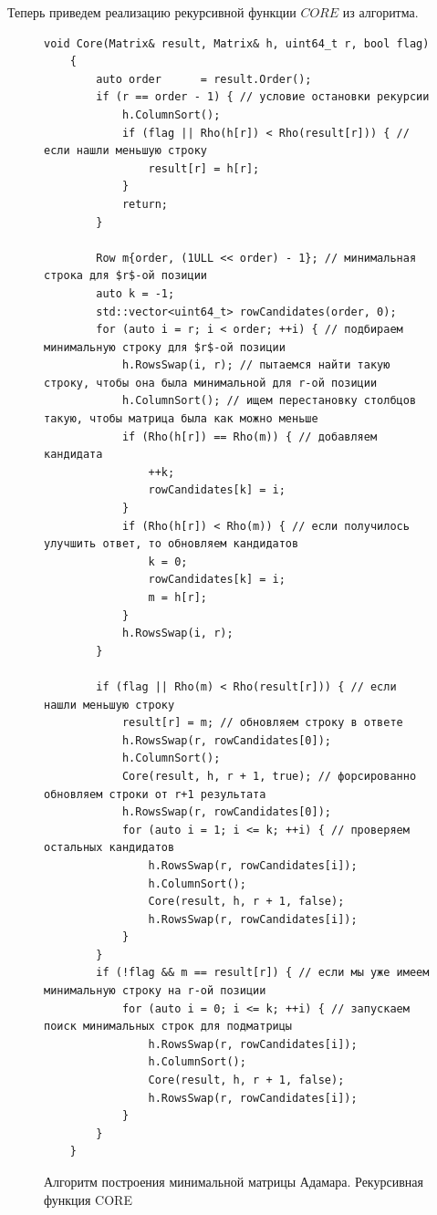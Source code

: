 \documentclass[a4paper, 14pt]{extreport}
\begin{document}
Теперь приведем реализацию рекурсивной функции $CORE$ из алгоритма. 

\begin{figure}[H]
    \centering
    \begin{minipage}{\linewidth}
    \begin{lstlisting}[language=С++, tabsize=4, showspaces=false, basicstyle=\fontsize{9.5}{8.0}\selectfont, numbers=none]
    void Core(Matrix& result, Matrix& h, uint64_t r, bool flag)
    {
        auto order      = result.Order();
        if (r == order - 1) { // условие остановки рекурсии
            h.ColumnSort();
            if (flag || Rho(h[r]) < Rho(result[r])) { // если нашли меньшую строку
                result[r] = h[r];
            }
            return;
        }
    
        Row m{order, (1ULL << order) - 1}; // минимальная строка для $r$-ой позиции
        auto k = -1;
        std::vector<uint64_t> rowCandidates(order, 0);
        for (auto i = r; i < order; ++i) { // подбираем минимальную строку для $r$-ой позиции
            h.RowsSwap(i, r); // пытаемся найти такую строку, чтобы она была минимальной для r-ой позиции
            h.ColumnSort(); // ищем перестановку столбцов такую, чтобы матрица была как можно меньше
            if (Rho(h[r]) == Rho(m)) { // добавляем кандидата
                ++k;
                rowCandidates[k] = i;
            }
            if (Rho(h[r]) < Rho(m)) { // если получилось улучшить ответ, то обновляем кандидатов
                k = 0;
                rowCandidates[k] = i;
                m = h[r];
            }
            h.RowsSwap(i, r);
        }
    
        if (flag || Rho(m) < Rho(result[r])) { // если нашли меньшую строку
            result[r] = m; // обновляем строку в ответе
            h.RowsSwap(r, rowCandidates[0]);
            h.ColumnSort();
            Core(result, h, r + 1, true); // форсированно обновляем строки от r+1 результата
            h.RowsSwap(r, rowCandidates[0]);
            for (auto i = 1; i <= k; ++i) { // проверяем остальных кандидатов
                h.RowsSwap(r, rowCandidates[i]);
                h.ColumnSort();
                Core(result, h, r + 1, false);
                h.RowsSwap(r, rowCandidates[i]);
            }
        }
        if (!flag && m == result[r]) { // если мы уже имеем минимальную строку на r-ой позиции
            for (auto i = 0; i <= k; ++i) { // запускаем поиск минимальных строк для подматрицы
                h.RowsSwap(r, rowCandidates[i]);
                h.ColumnSort();
                Core(result, h, r + 1, false);
                h.RowsSwap(r, rowCandidates[i]);
            }
        }
    }
    \end{lstlisting}
    \end{minipage}
    \caption{Алгоритм построения минимальной матрицы Адамара. Рекурсивная функция CORE}
    \label{alg:mm_finder_core}
\end{figure}
\end{document}

